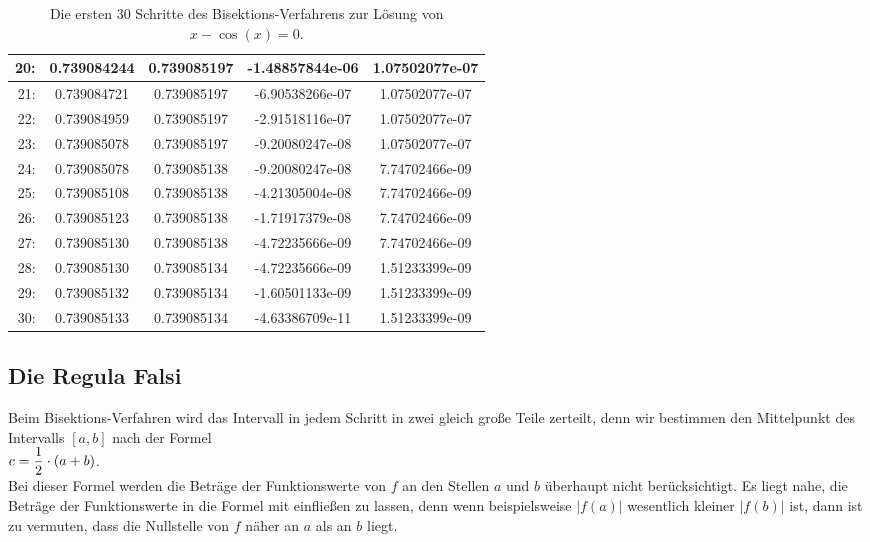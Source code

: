 \begin{table}[!h]
{\begin{tabular}{|r|c|c|c|c|}
\hline
 20: & 0.739084244 & 0.739085197 & -1.48857844e-06 & 1.07502077e-07 \\
\hline
 21: & 0.739084721 & 0.739085197 & -6.90538266e-07 & 1.07502077e-07 \\
\hline
 22: & 0.739084959 & 0.739085197 & -2.91518116e-07 & 1.07502077e-07 \\
\hline
 23: & 0.739085078 & 0.739085197 & -9.20080247e-08 & 1.07502077e-07 \\
\hline
 24: & 0.739085078 & 0.739085138 & -9.20080247e-08 & 7.74702466e-09 \\
\hline
 25: & 0.739085108 & 0.739085138 & -4.21305004e-08 & 7.74702466e-09 \\
\hline
 26: & 0.739085123 & 0.739085138 & -1.71917379e-08 & 7.74702466e-09 \\
\hline
 27: & 0.739085130 & 0.739085138 & -4.72235666e-09 & 7.74702466e-09 \\
\hline
 28: & 0.739085130 & 0.739085134 & -4.72235666e-09 & 1.51233399e-09 \\
\hline
 29: & 0.739085132 & 0.739085134 & -1.60501133e-09 & 1.51233399e-09 \\
\hline
 30: & 0.739085133 & 0.739085134 & -4.63386709e-11 & 1.51233399e-09 \\
\hline
  \end{tabular}}
  \caption{Die ersten 30 Schritte des Bisektions-Verfahrens zur L\"osung von $x - \cos(x) = 0$.}
  \label{tab:bisection}
\end{table}


\subsection{Die Regula Falsi}
Beim Bisektions-Verfahren wird das Intervall in jedem Schritt in zwei gleich gro{\ss}e Teile
zerteilt, denn wir bestimmen den Mittelpunkt des Intervalls $[a, b]$ nach der Formel
\\[0.2cm]
\hspace*{1.3cm}
$\displaystyle c = \frac{1}{2} \cdot (a + b)$.
\\[0.2cm]
Bei dieser Formel werden die Betr\"age der Funktionswerte von $f$ an den Stellen $a$ und $b$ \"uberhaupt
nicht ber\"ucksichtigt.  Es liegt nahe, die Betr\"age der Funktionswerte in die Formel mit einflie{\ss}en zu
lassen, denn wenn beispielsweise $|f(a)|$ wesentlich kleiner $|f(b)|$ ist, dann ist zu
vermuten, dass die Nullstelle von $f$ n\"aher an $a$ als an $b$ liegt.

